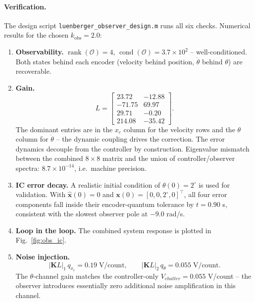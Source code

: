 \documentclass[11pt,a4paper]{article}
\begin{document}
\paragraph{Verification.}
The design script \texttt{luenberger\_observer\_design.m} runs all six checks. Numerical results for the chosen $k_{\mathrm{obs}} = 2.0$:
\begin{enumerate}
	\item \textbf{Observability.} $\operatorname{rank}(\mathcal{O}) = 4$, $\operatorname{cond}(\mathcal{O}) = 3.7\times 10^{2}$ -- well-conditioned. Both states behind each encoder (velocity behind position, $\dot\theta$ behind $\theta$) are recoverable.
	\item \textbf{Gain.}
	\begin{equation}
		L = \begin{bmatrix} 23.72 & -12.88 \\ -71.75 & 69.97 \\ 29.71 & -0.20 \\ 214.08 & -35.42 \end{bmatrix}.
	\end{equation}
	The dominant entries are in the $x_c$ column for the velocity rows and the $\theta$ column for $\dot\theta$ -- the dynamic coupling drives the correction.
	The error dynamics decouple from the controller by construction. Eigenvalue mismatch between the combined $8\times 8$ matrix and the union of controller/observer spectra: $8.7\times 10^{-14}$, i.e.\ machine precision.
	\item \textbf{IC error decay.} A realistic initial condition of $\theta(0) = 2^\circ$ is used for validation. With $\hat{\mathbf{x}}(0)=0$ and $\mathbf{x}(0) = [0,0,2^\circ,0]^\top$, all four error components fall inside their encoder-quantum tolerance by $t = 0.90$ s, consistent with the slowest observer pole at $-9.0$ rad/s.
	\item \textbf{Loop in the loop.} The combined system response is plotted in Fig.~\ref{fig:obs_ic}.
	\item \textbf{Noise injection.}
	\begin{equation}
		|\mathbf{K} L|_1\,q_{x_c} = 0.19\;\text{V/count}, \qquad
		|\mathbf{K} L|_2\,q_\theta = 0.055\;\text{V/count}.
	\end{equation}
	The $\theta$-channel gain matches the controller-only $V_{chatter} = 0.055$ V/count -- the observer introduces essentially zero additional noise amplification in this channel.
\end{enumerate}
\end{document}
